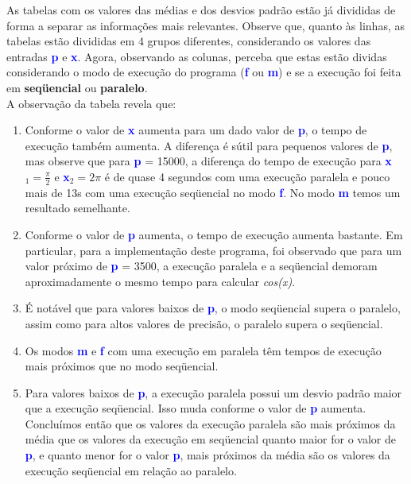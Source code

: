 \documentclass[11pt]{article}
\begin{document}
As tabelas com os valores das médias e dos desvios padrão estão já divididas de forma a separar as informações mais relevantes. Observe que, quanto às linhas, as tabelas estão divididas em 4 grupos diferentes, considerando os valores das entradas \textbf{\textcolor{blue}{p}} e \textbf{\textcolor{blue}{x}}. Agora, observando as colunas, perceba que estas estão dividas considerando o modo de execução do programa (\textbf{\textcolor{blue}{f}} ou \textbf{\textcolor{blue}{m}}) e se a execução foi feita em \textbf{seqüencial} ou \textbf{paralelo}. 
\\
\noindent A observação da tabela revela que:
\begin{enumerate}
	\item Conforme o valor de \textbf{\textcolor{blue}{x}} aumenta para um dado valor de \textbf{\textcolor{blue}{p}}, o tempo de execução também aumenta. A diferença é sútil para pequenos valores de \textbf{\textcolor{blue}{p}}, mas observe que para \textbf{\textcolor{blue}{p}} = 15000, a diferença do tempo de execução para \textbf{\textcolor{blue}{x}}$_1 = \frac{\pi}{2}$ e \textbf{\textcolor{blue}{x}}$_2 = 2\pi$ é de quase 4 segundos com uma execução paralela e pouco mais de 13s com uma execução seqüencial no modo \textbf{\textcolor{blue}{f}}. No modo \textbf{\textcolor{blue}{m}} temos um resultado semelhante.
	\item Conforme o valor de \textbf{\textcolor{blue}{p}} aumenta, o tempo de execução aumenta bastante. Em particular, para a implementação deste programa, foi observado que para um valor próximo de \textbf{\textcolor{blue}{p}} = 3500, a execução paralela e a seqüencial demoram aproximadamente o mesmo tempo para calcular \textit{cos(x)}.
	\item É notável que para valores baixos de \textbf{\textcolor{blue}{p}}, o modo seqüencial supera o paralelo, assim como para altos valores de precisão, o paralelo supera o seqüencial.
	\item Os modos \textbf{\textcolor{blue}{m}} e \textbf{\textcolor{blue}{f}} com uma execução em paralela têm tempos de execução mais próximos que no modo seqüencial.
	\item Para valores baixos de \textbf{\textcolor{blue}{p}}, a execução paralela possui um desvio padrão maior que a execução seqüencial. Isso muda conforme o valor de \textbf{\textcolor{blue}{p}} aumenta. Concluímos então que os valores da execução paralela são mais próximos da média que os valores da execução em seqüencial quanto maior for o valor de \textbf{\textcolor{blue}{p}}, e quanto menor for o valor \textbf{\textcolor{blue}{p}}, mais próximos da média são os valores da execução seqüencial em relação ao paralelo. 
\end{enumerate}
\end{document}
